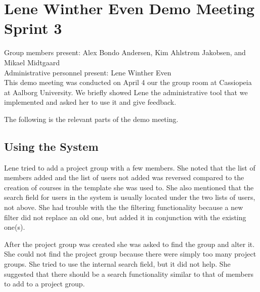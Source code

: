 \section{Lene Winther Even Demo Meeting Sprint 3}
\label{sec:lenedemoone}
Group members present: Alex Bondo Andersen, Kim Ahlstr\o{}m Jakobsen, and Mikael Midtgaard\\
Administrative personnel present: Lene Winther Even\\

This demo meeting was conducted on April 4\ths{} our the group room at Cassiopeia at Aalborg University.
We briefly showed Lene the administrative tool that we implemented and asked her to use it and give feedback.

The following is the relevant parts of the demo meeting.

\subsection*{Using the System}
Lene tried to add a project group with a few members.
She noted that the list of members added and the list of users not added was reversed compared to the creation of courses in the \moodle{} template she was used to.
She also mentioned that the search field for users in the system is usually located under the two lists of users, not above.
She had trouble with the the filtering functionality because a new filter did not replace an old one, but added it in conjunction with the existing one(s).

After the project group was created she was asked to find the group and alter it.
She could not find the project group because there were simply too many project groups.
She tried to use the internal search field, but it did not help.
She suggested that there should be a search functionality similar to that of members to add to a project group.

